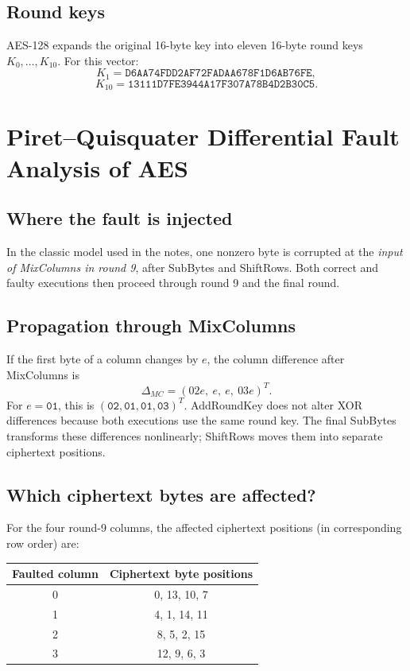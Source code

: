 \documentclass[11pt,a4paper]{report}
\newcommand{\hex}[1]{\texttt{#1}}
\begin{document}
\section{Round keys}
AES-128 expands the original 16-byte key into eleven 16-byte round keys \(K_0,\ldots,K_{10}\). For this vector:
\[K_1=\hex{D6AA74FDD2AF72FADAA678F1D6AB76FE},\]
\[K_{10}=\hex{13111D7FE3944A17F307A78B4D2B30C5}.\]

\chapter{Piret--Quisquater Differential Fault Analysis of AES}
\section{Where the fault is injected}
In the classic model used in the notes, one nonzero byte is corrupted at the \emph{input of MixColumns in round 9}, after SubBytes and ShiftRows. Both correct and faulty executions then proceed through round 9 and the final round.
\begin{center}\end{center}
\section{Propagation through MixColumns}
If the first byte of a column changes by \(e\), the column difference after MixColumns is
\[\Delta_{MC}=(02e,\ e,\ e,\ 03e)^T.\]
For \(e=\hex{01}\), this is \((\hex{02},\hex{01},\hex{01},\hex{03})^T\). AddRoundKey does not alter XOR differences because both executions use the same round key. The final SubBytes transforms these differences nonlinearly; ShiftRows moves them into separate ciphertext positions.
\section{Which ciphertext bytes are affected?}
For the four round-9 columns, the affected ciphertext positions (in corresponding row order) are:
\begin{center}\begin{tabular}{cc}\toprule Faulted column & Ciphertext byte positions\\\midrule 0&0, 13, 10, 7\\1&4, 1, 14, 11\\2&8, 5, 2, 15\\3&12, 9, 6, 3\\\bottomrule\end{tabular}\end{center}
\end{document}
